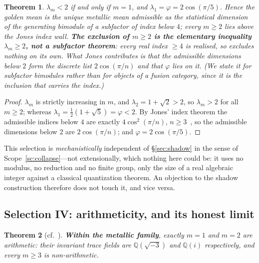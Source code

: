 \documentclass[11pt,reqno]{amsart}
\theoremstyle{plain}
\newtheorem{theorem}{Theorem}[section]
\theoremstyle{definition}
\theoremstyle{remark}
\newcommand{\Q}{\mathbb{Q}}
\begin{document}
\begin{theorem}\label{thm:jones}
$\lambda_m<2$ if and only if $m=1$, and $\lambda_1=\varphi=2\cos(\pi/5)$. Hence the golden mean is the unique metallic mean admissible as the \emph{statistical
dimension of the generating bimodule of a subfactor of index below $4$}; every $m\ge2$
lies above the Jones index wall. \textbf{The exclusion of $m\ge2$ is the elementary
inequality $\lambda_m\ge2$, not a subfactor theorem}: every real index $\ge4$ is
realised, so \cite{Jones} excludes nothing on its own. What Jones contributes is that
the admissible dimensions \emph{below} $2$ form the discrete list $2\cos(\pi/n)$ and
that $\varphi$ lies on it. (We state it for subfactor bimodules rather than for
objects of a fusion category, since it is the inclusion that carries the index.)
\end{theorem}

\begin{proof}
$\lambda_m$ is strictly increasing in $m$, and $\lambda_2=1+\sqrt2>2$, so $\lambda_m>2$
for all $m\ge2$; whereas $\lambda_1=\tfrac12(1+\sqrt5)=\varphi<2$. By Jones' index
theorem the admissible indices below $4$ are exactly $4\cos^2(\pi/n)$, $n\ge3$~\cite{Jones}, so the
admissible dimensions below $2$ are $2\cos(\pi/n)$; and $\varphi=2\cos(\pi/5)$.
\end{proof}

This selection is \emph{mechanistically} independent of \S\ref{sec:shadow} in the sense
of Scope~\ref{sc:collapse}---not extensionally, which nothing here could be: it uses no
modulus, no reduction and no finite group, only the size of a real algebraic integer
against a classical quantization theorem. An objection to the shadow construction
therefore does not touch it, and vice versa.

\subsection{Selection IV: arithmeticity, and its honest limit}\label{sec:arithmeticity}

\begin{theorem}[cf.~\cite{MaclachlanReid,BMR}]\label{thm:arith}
\textbf{Within the metallic family}, exactly $m=1$ and $m=2$ are arithmetic: their
invariant trace fields are $\Q(\sqrt{-3})$ and $\Q(i)$ respectively, and every $m\ge3$
is non-arithmetic.
\end{theorem}
\end{document}
